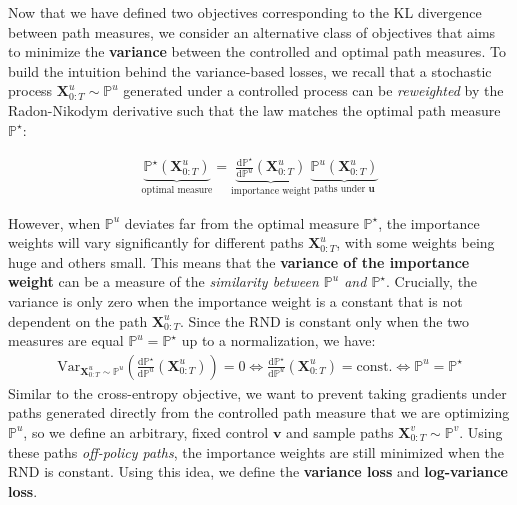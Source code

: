 \documentclass{article}
\newcommand{\boldtext}[1]{\textbf{\textcolor{MyGreen}{#1}}}
\begin{document}
Now that we have defined two objectives corresponding to the KL divergence between path measures, we consider an alternative class of objectives that aims to minimize the \boldtext{variance} between the controlled and optimal path measures. To build the intuition behind the variance-based losses, we recall that a stochastic process $\boldsymbol{X}_{0:T}^u\sim\mathbb{P}^u$ generated under a controlled process can be \textit{reweighted} by the Radon-Nikodym derivative such that the law matches the optimal path measure $\mathbb{P}^\star$:
\begin{small}
\begin{align}
    \underbrace{\mathbb{P}^\star(\boldsymbol{X}^u_{0:T})}_{\text{optimal measure}}=\underbrace{\frac{\mathrm{d}\mathbb{P}^\star}{\mathrm{d}\mathbb{P}^u}(\boldsymbol{X}^u_{0:T})}_{\text{importance weight}}\underbrace{\mathbb{P}^u(\boldsymbol{X}^u_{0:T})}_{\text{paths under }\boldsymbol{u}}
\end{align}
\end{small}
However, when $\mathbb{P}^u$ deviates far from the optimal measure $\mathbb{P}^\star$, the importance weights will vary significantly for different paths $\boldsymbol{X}_{0:T}^u$, with some weights being huge and others small. This means that the \boldtext{variance of the importance weight} can be a measure of the \textit{similarity between $\mathbb{P}^u$ and $\mathbb{P}^\star$}. Crucially, the variance is only zero when the importance weight is a constant that is not dependent on the path $\boldsymbol{X}_{0:T}^u$. Since the RND is constant only when the two measures are equal $\mathbb{P}^u=\mathbb{P}^\star$ up to a normalization, we have:
\begin{align}
    \text{Var}_{\boldsymbol{X}_{0:T}^u\sim\mathbb{P}^u}\left(\frac{\mathrm{d}\mathbb{P}^\star}{\mathrm{d}\mathbb{P}^u}(\boldsymbol{X}_{0:T}^u)\right)=0\iff \frac{\mathrm{d}\mathbb{P}^\star}{\mathrm{d}\mathbb{P}^u}(\boldsymbol{X}_{0:T}^u)=\text{const.}\iff\mathbb{P}^u=\mathbb{P}^\star
\end{align}
Similar to the cross-entropy objective, we want to prevent taking gradients under paths generated directly from the controlled path measure that we are optimizing $\mathbb{P}^u$, so we define an arbitrary, fixed control $\boldsymbol{v}$ and sample paths $\boldsymbol{X}_{0:T}^v\sim \mathbb{P}^v$. Using these paths \textit{off-policy paths}, the importance weights are still minimized when the RND is constant. Using this idea, we define the \boldtext{variance loss} and \boldtext{log-variance loss}.
\end{document}
